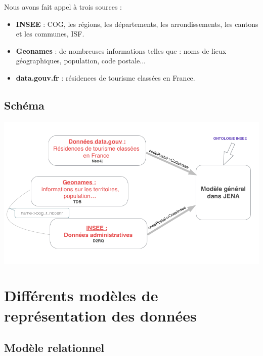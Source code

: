 \documentclass[12pt]{beamer}
\begin{document}
\begin{frame}
Nous avons fait appel à trois sources  :
\begin{itemize}
	\item \textbf{INSEE} : COG,  les régions, les départements, les arrondissements, les cantons et les communes, ISF.
	\item \textbf{Geonames} :  de nombreuses informations telles que : noms de lieux géographiques, population, code postale...
	\item \textbf{data.gouv.fr} :  résidences de tourisme classées en France.
\end{itemize}




\end{frame}
\subsection{Schéma}

\begin{frame}
\begin{center}
	\includegraphics[scale=0.38]{interconnexion.png} 
	
	\label{fig_interconnexion}
\end{center}

\end{frame}
\section{Différents modèles de représentation des données}


\subsection{Modèle relationnel}
\end{document}
